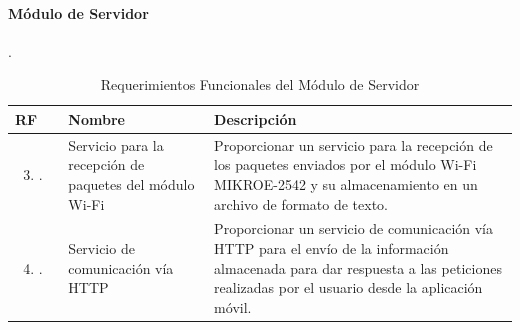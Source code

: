 \paragraph{Módulo de Servidor}.
\begin{longtable}{|M{1.6cm}|M{4.0cm}|M{6.0cm}|}
    \caption{Requerimientos Funcionales del Módulo de Servidor}
	\hline
	\textbf{RF} & \textbf{Nombre} & \textbf{Descripción} \\ 
	\hline
 	\begin{enumerate}[label=RF\arabic*]
 	    \setcounter{enumi}{2}
 	    \item.
 	\end{enumerate}
 	& Servicio para la recepción de paquetes del módulo Wi-Fi
 	& Proporcionar un servicio para la recepción de los paquetes enviados por el módulo Wi-Fi MIKROE-2542 y su almacenamiento en un archivo de formato de texto.\\
    \hline
    \begin{enumerate}[label=RF\arabic*]
        \setcounter{enumi}{3}
 	    \item.
 	\end{enumerate}
 	& Servicio de comunicación vía HTTP
 	& Proporcionar un servicio de comunicación vía HTTP para el envío de la información almacenada para dar respuesta a las peticiones realizadas por el usuario desde la aplicación móvil. \\
    \hline
\end{longtable}



